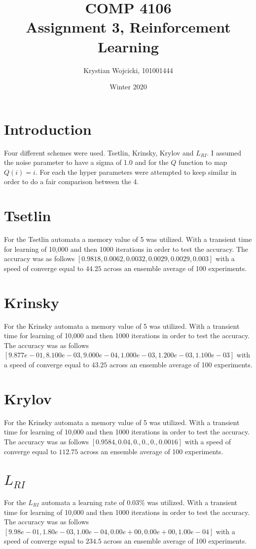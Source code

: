 \documentclass{article}
\title{COMP 4106\\
	\large{Assignment 3, Reinforcement Learning}}
\author{Krystian Wojcicki, 101001444}
\date{Winter 2020}
\begin{document}
\maketitle

\section{Introduction}
Four different schemes were used. Tsetlin, Krinsky, Krylov and $L_{RI}$. I assumed the noise parameter to have a sigma of 1.0 and for the $Q$ function to map $Q(i) = i$. For each the hyper parameters were attempted to keep similar in order to do a fair comparison between the 4.

\section{Tsetlin}
 For the Tsetlin automata a memory value of 5 was utilized. With a transient time for learning of 10,000 and then 1000 iterations in order to test the accuracy. The accuracy was as follows $[0.9818, 0.0062, 0.0032, 0.0029, 0.0029, 0.003 ]$ with a speed of converge equal to $44.25$ across an ensemble average of 100 experiments. 

\section{Krinsky}
 For the Krinsky automata a memory value of 5 was utilized. With a transient time for learning of 10,000 and then 1000 iterations in order to test the accuracy. The accuracy was as follows $[9.877e-01, 8.100e-03, 9.000e-04, 1.000e-03, 1.200e-03, 1.100e-03]$ with a speed of converge equal to $43.25$ across an ensemble average of 100 experiments. 

\section{Krylov}
 For the Krinsky automata a memory value of 5 was utilized. With a transient time for learning of 10,000 and then 1000 iterations in order to test the accuracy. The accuracy was as follows $[0.9584, 0.04,   0.,     0.,     0.,     0.0016]$ with a speed of converge equal to $112.75$ across an ensemble average of 100 experiments. 

\section{$L_{RI}$}
 For the $L_{RI}$ automata a learning rate of $0.03\%$ was utilized. With a transient time for learning of 10,000 and then 1000 iterations in order to test the accuracy. The accuracy was as follows $[9.98e-01, 1.80e-03, 1.00e-04, 0.00e+00, 0.00e+00, 1.00e-04]$ with a speed of converge equal to $234.5$ across an ensemble average of 100 experiments. 
\end{document}

